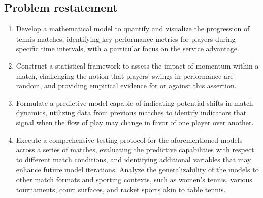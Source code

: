 \documentclass{article}
\begin{document}
\subsection{Problem restatement}
\begin{enumerate}
\item  Develop a mathematical model to quantify and visualize the progression of tennis matches, identifying key performance metrics for players during specific time intervals, with a particular focus on the service advantage.
\item Construct a statistical framework to assess the impact of momentum within a match, challenging the notion that players' swings in performance are random, and providing empirical evidence for or against this assertion.
\item Formulate a predictive model capable of indicating potential shifts in match dynamics, utilizing data from previous matches to identify indicators that signal when the flow of play may change in favor of one player over another.
\item Execute a comprehensive testing protocol for the aforementioned models across a series of matches, evaluating the predictive capabilities with respect to different match conditions, and identifying additional variables that may enhance future model iterations. Analyze the generalizability of the models to other match formats and sporting contexts, such as women's tennis, various tournaments, court surfaces, and racket sports akin to table tennis.
\end{enumerate}
\end{document}
